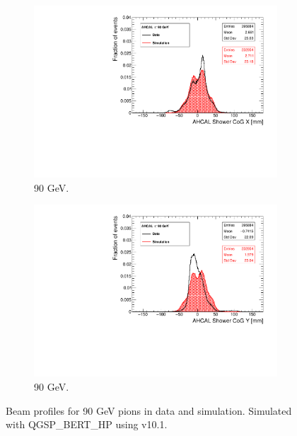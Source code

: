 \begin{figure}[htbp!]
  \centering
  \begin{subfigure}[t]{0.49\textwidth}
    \includegraphics[width=1.\linewidth]{../Thesis_Plots/Timing/Pions/Plots/Run24332_CoGX_AHCAL_90GeV_Comparison.pdf}
    \caption{90 GeV.} \label{fig:pi90GeVX}
  \end{subfigure}
  \hfill
  \begin{subfigure}[t]{0.49\textwidth}
    \includegraphics[width=1.\linewidth]{../Thesis_Plots/Timing/Pions/Plots/Run24332_CoGY_AHCAL_90GeV_Comparison.pdf}
    \caption{90 GeV.} \label{fig:pi90GeVY}
  \end{subfigure}
  \caption{Beam profiles for 90 GeV pions in data and simulation. Simulated with QGSP\_BERT\_HP using \geant v10.1.}
\end{figure}


